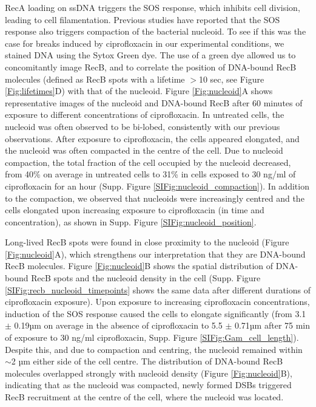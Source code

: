 RecA loading on ssDNA triggers the SOS response, which inhibits cell division, leading to cell filamentation. Previous studies have reported that the SOS response also triggers compaction of the bacterial nucleoid\cite{Odsbu2014}. To see if this was the case for breaks induced by ciprofloxacin in our experimental conditions, we stained DNA using the Sytox Green dye. The use of a green dye allowed us to concomitantly image RecB, and to correlate the position of DNA-bound RecB molecules (defined as RecB spots with a lifetime $>$10 sec, see Figure \ref{Fig:lifetimes}D) with that of the nucleoid. Figure \ref{Fig:nucleoid}A shows representative images of the nucleoid and DNA-bound RecB after 60 minutes of exposure to different concentrations of ciprofloxacin. In untreated cells, the nucleoid was often observed to be bi-lobed, consistently with our previous observations\cite{Lepore2023}. After exposure to ciprofloxacin, the cells appeared elongated, and the nucleoid was often compacted in the centre of the cell. Due to nucleoid compaction, the total fraction of the cell occupied by the nucleoid decreased, from 40\% on average in untreated cells to 31\% in cells exposed to 30 ng/ml of ciprofloxacin for an hour (Supp. Figure \ref{SIFig:nucleoid_compaction}). In addition to the compaction, we observed that nucleoids were increasingly centred and the cells elongated upon increasing exposure to ciprofloxacin (in time and concentration), as shown in Supp. Figure \ref{SIFig:nucleoid_position}.

Long-lived RecB spots were found in close proximity to the nucleoid (Figure \ref{Fig:nucleoid}A), which strengthens our interpretation that they are DNA-bound RecB molecules. Figure \ref{Fig:nucleoid}B shows the spatial distribution of DNA-bound RecB spots and the nucleoid density in the cell (Supp. Figure \ref{SIFig:recb_nucleoid_timepoints} shows the same data after different durations of ciprofloxacin exposure). Upon exposure to increasing ciprofloxacin concentrations, induction of the SOS response caused the cells to elongate significantly (from 3.1 $\pm$ 0.19µm on average in the absence of ciprofloxacin to 5.5 $\pm$ 0.71µm after 75 min of exposure to 30 ng/ml ciprofloxacin, Supp. Figure \ref{SIFig:Gam_cell_length}). Despite this, and due to compaction and centring, the nucleoid remained within $\sim$2 µm either side of the cell centre. The distribution of DNA-bound RecB molecules overlapped strongly with nucleoid density (Figure \ref{Fig:nucleoid}B), indicating that as the nucleoid was compacted, newly formed DSBs triggered RecB recruitment at the centre of the cell, where the nucleoid was located.

